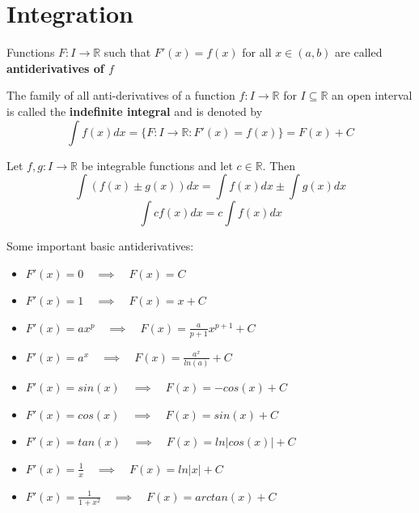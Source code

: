 \section{Integration}


\begin{definition}
    Functions $F: I \to \mathbb{R}$ such that $F'(x) = f(x)$ for all $x \in (a, b)$ are called
    \textbf{antiderivatives of $f$}
\end{definition}

\begin{definition}
   The family of all anti-derivatives of a function $f: I \to \mathbb{R}$ for $I \subseteq \mathbb{R}$ an open interval is called the \textbf{indefinite integral} and is denoted by
   $$\int f(x) dx = \{ F: I \to \mathbb{R} : F'(x) = f(x) \} = F(x) + C $$
\end{definition}

\begin{theorem}
    Let $f, g: I \to \mathbb{R}$ be integrable functions and let $c \in \mathbb{R}$. Then
    $$\int (f(x) \pm g(x)) dx = \int f(x) dx \pm \int g(x) dx$$
    $$\int c f(x) dx = c \int f(x) dx$$
\end{theorem}

\begin{remark}
    Some important basic antiderivatives:
    \begin{itemize}
        \item $F'(x) = 0 \quad \implies \quad F(x) = C$
        \item $F'(x) = 1 \quad \implies \quad F(x) = x + C$
        \item $F'(x) = a x^p \quad \implies \quad F(x) = \frac{a}{p+1} x^{p+1} + C$
        \item $F'(x) = a^x \quad \implies \quad F(x) = \frac{a^x}{ln(a)} + C$
        \item $F'(x) = sin(x) \quad \implies \quad F(x) = -cos(x) + C$
        \item $F'(x) = cos(x) \quad \implies \quad F(x) = sin(x) + C$
        \item $F'(x) = tan(x) \quad \implies \quad F(x) = ln|cos(x)| + C$
        \item $F'(x) = \frac{1}{x} \quad \implies \quad F(x) = ln|x| + C$
        \item $F'(x) = \frac{1}{1+x^2} \quad \implies \quad F(x) = arctan(x) + C$
    \end{itemize}
    
\end{remark}

